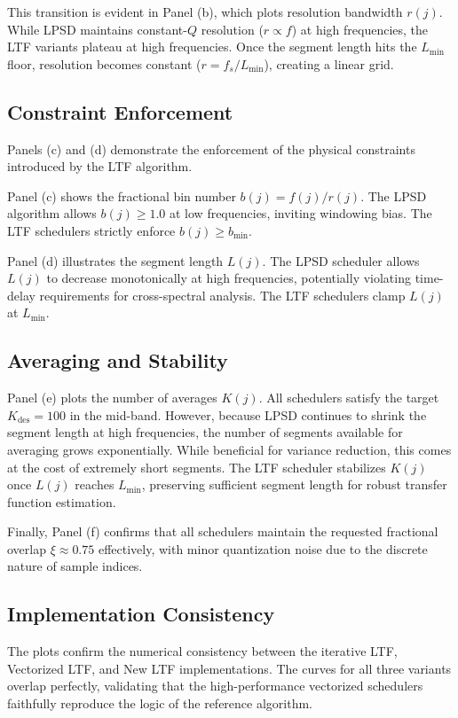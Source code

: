 \documentclass[final, 5p, times, twocolumn, number, sort&compress]{elsarticle}
\begin{document}
This transition is evident in Panel (b), which plots resolution bandwidth $r(j)$. While LPSD maintains constant-$Q$ resolution ($r \propto f$) at high frequencies, the LTF variants plateau at high frequencies. Once the segment length hits the $L_{\min}$ floor, resolution becomes constant ($r = f_s / L_{\min}$), creating a linear grid.

\subsection{Constraint Enforcement}

Panels (c) and (d) demonstrate the enforcement of the physical constraints introduced by the LTF algorithm. 

Panel (c) shows the fractional bin number $b(j) = f(j)/r(j)$. The LPSD algorithm allows $b(j) \ge 1.0$ at low frequencies, inviting windowing bias. The LTF schedulers strictly enforce $b(j) \ge b_{\min}$.

Panel (d) illustrates the segment length $L(j)$. The LPSD scheduler allows $L(j)$ to decrease monotonically at high frequencies, potentially violating time-delay requirements for cross-spectral analysis. The LTF schedulers clamp $L(j)$ at $L_{\min}$.

\subsection{Averaging and Stability}

Panel (e) plots the number of averages $K(j)$. All schedulers satisfy the target $K_{\text{des}}=100$ in the mid-band. However, because LPSD continues to shrink the segment length at high frequencies, the number of segments available for averaging grows exponentially. While beneficial for variance reduction, this comes at the cost of extremely short segments. The LTF scheduler stabilizes $K(j)$ once $L(j)$ reaches $L_{\min}$, preserving sufficient segment length for robust transfer function estimation.

Finally, Panel (f) confirms that all schedulers maintain the requested fractional overlap $\xi \approx 0.75$ effectively, with minor quantization noise due to the discrete nature of sample indices.

\subsection{Implementation Consistency}

The plots confirm the numerical consistency between the iterative LTF, Vectorized LTF, and New LTF implementations. The curves for all three variants overlap perfectly, validating that the high-performance vectorized schedulers faithfully reproduce the logic of the reference algorithm.
\end{document}
